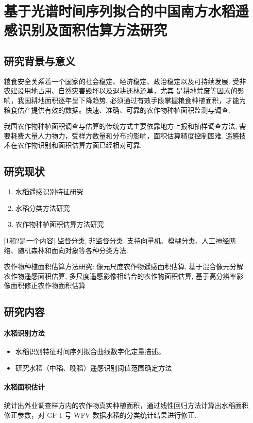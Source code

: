 \section{基于光谱时间序列拟合的中国南方水稻遥感识别及面积估算方法研究}

\subsection{研究背景与意义}
粮食安全关系着一个国家的社会稳定、经济稳定、政治稳定以及可持续发展. 受非农建设用地占用、自然灾害毁坏以及退耕还林还草，尤其
是耕地荒废等因素的影响，我国耕地面积逐年呈下降趋势, 必须通过有效手段掌握粮食种植面积，才能为粮食估产提供有效的数据。快速、准确、可靠的农作物种植面积监测与调查.

我国农作物种植面积调查与估算的传统方式主要依靠地方上报和抽样调查方法, 需要耗费大量人力物力，受样方数量和分布的影响，面积估算精度控制困难. 遥感技术在农作物识别和面积估算方面已经相对可靠.

\subsection{研究现状}
\begin{enumerate}
    \item 水稻遥感识别特征研究
    \item 水稻分类方法研究
    \item 农作物种植面积估算方法研究
\end{enumerate}
[1和2是一个内容] 监督分类, 非监督分类. 支持向量机、模糊分类、人工神经网络、随机森林和面向对象等各种分类方法.

农作物种植面积估算方法研究: 像元尺度农作物遥感面积估算, 基于混合像元分解农作物遥感面积估算, 多尺度遥感影像相结合的农作物面积估算, 基于高分辨率影像面积修正农作物面积估算


\subsection{研究内容}
\paragraph*{水稻识别方法}
\begin{itemize}
    \item 水稻识别特征时间序列拟合曲线数字化定量描述。
    \item 研究水稻（中稻、晚稻）遥感识别阈值范围确定方法 
\end{itemize}

\paragraph*{水稻面积估计}
统计出外业调查样方内的农作物真实种植面积，通过线性回归方法计算出水稻面积修正参数，对 GF-1 号 WFV 数据水稻的分类统计结果进行修正.
